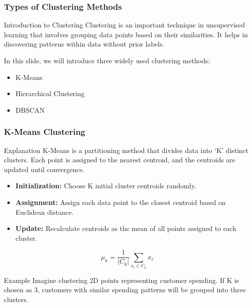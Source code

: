 \documentclass[aspectratio=169]{beamer}
\begin{document}
\begin{frame}[fragile]
  \frametitle{Types of Clustering Methods}
  \begin{block}{Introduction to Clustering}
    Clustering is an important technique in unsupervised learning that involves grouping data points based on their similarities. It helps in discovering patterns within data without prior labels. 
  \end{block}
  In this slide, we will introduce three widely used clustering methods:
  \begin{itemize}
    \item K-Means
    \item Hierarchical Clustering
    \item DBSCAN
  \end{itemize}
\end{frame}

\begin{frame}[fragile]
  \frametitle{K-Means Clustering}
  \begin{block}{Explanation}
    K-Means is a partitioning method that divides data into ‘K’ distinct clusters. Each point is assigned to the nearest centroid, and the centroids are updated until convergence.
  \end{block}
  \begin{itemize}
    \item \textbf{Initialization:} Choose K initial cluster centroids randomly.
    \item \textbf{Assignment:} Assign each data point to the closest centroid based on Euclidean distance.
    \item \textbf{Update:} Recalculate centroids as the mean of all points assigned to each cluster.
  \end{itemize}
  \begin{equation}
    \mu_k = \frac{1}{|C_k|} \sum_{x_i \in C_k} x_i
  \end{equation}
  \begin{block}{Example}
    Imagine clustering 2D points representing customer spending. If K is chosen as 3, customers with similar spending patterns will be grouped into three clusters.
  \end{block}
\end{frame}
\end{document}
